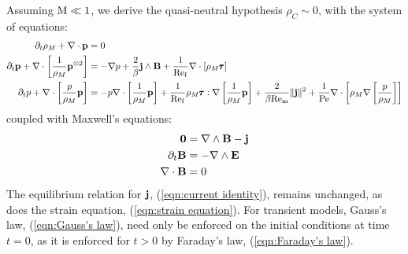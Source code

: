     Assuming $\mathrm{M}  \ll  1$, we derive the quasi-neutral hypothesis $\rho_{C}  \sim  0$, with the system of equations:
    {\small \begin{align}
        \partial_{t}\rho_{M} + \nabla\cdot\mathbf{p}  &=  0  \label{eqn:mass conservation} 
         \\
        \partial_{t}\mathbf{p} + \nabla\cdot\left[\frac{1}{\rho_{M}}\mathbf{p}^{\otimes 2}\right]  &=  - \nabla p + \frac{2}{\beta}\mathbf{j}\wedge\mathbf{B} + \frac{1}{\mathrm{Re}_{\mathrm{f}}}\nabla\cdot[\rho_{M}\pmb{\mathsf{\tau}}]  \label{eqn:momentum conservation}  \\
        \partial_{t}p + \nabla\cdot\left[\frac{p}{\rho_{M}}\mathbf{p}\right]  &=  - p\nabla\cdot\left[\frac{1}{\rho_{M}}\mathbf{p}\right] + \frac{1}{\mathrm{Re}_{\mathrm{f}}}\rho_{M}\pmb{\mathsf{\tau}}:\nabla\left[\frac{1}{\rho_{M}}\mathbf{p}\right] + \frac{2}{\beta\mathrm{Re}_{\mathrm{m}}}\|\mathbf{j}\|^{2} + \frac{1}{\mathrm{Pe}}\nabla\cdot\left[\rho_{M}\nabla\left[\frac{p}{\rho_{M}}\right]\right]  \label{eqn:energy conservation}
    \end{align}}
    coupled with Maxwell's equations:
    \begin{align}
        \mathbf{0}  &=  \nabla\wedge\mathbf{B} - \mathbf{j}  \label{eqn:Ampère's law}  \\
        \partial_{t}\mathbf{B}  &=  - \nabla\wedge\mathbf{E}  \label{eqn:Faraday's law}  \\
        \nabla\cdot\mathbf{B}  &=  0  \label{eqn:Gauss's law}
    \end{align}
    The equilibrium relation for $\mathbf{j}$, (\ref{eqn:current identity}), remains unchanged, as does the strain equation, (\ref{eqn:strain equation}). For transient models, Gauss's law, (\ref{eqn:Gauss's law}), need only be enforced on the initial conditions at time $t  =  0$, as it is enforced for $t  >  0$ by Faraday's law, (\ref{eqn:Faraday's law}).

